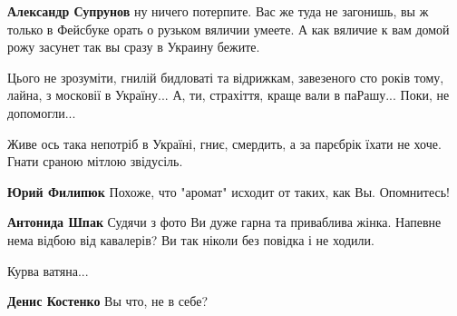 \begin{itemize}
\begin{itemize}

\textbf{Александр Супрунов} ну ничего потерпите. Вас же туда не загонишь, вы ж только в Фейсбуке орать о рузьком вяличии умеете. А как вяличие к вам домой рожу засунет так вы сразу в Украину бежите.
\end{itemize}



Цього не зрозуміти, гнилій бидловаті та відрижкам, завезеного сто років тому,
лайна, з московії в Україну... А, ти, страхіття, краще вали в паРашу... Поки,
не допомогли...



Живе ось така непотріб в Україні, гниє, смердить, а за парєбрік їхати не хоче.
Гнати сраною мітлою звідусіль.

\begin{itemize}

\textbf{Юрий Филипюк} Похоже, что "аромат" исходит от таких, как Вы. Опомнитесь!


\textbf{Антонида Шпак} Судячи з фото Ви дуже гарна та приваблива жінка. Напевне нема відбою від кавалерів? Ви так ніколи без повідка і не ходили.
\end{itemize}


Курва ватяна...

\begin{itemize}

\textbf{Денис Костенко} Вы что, не в себе?



\end{itemize}
\end{itemize}
